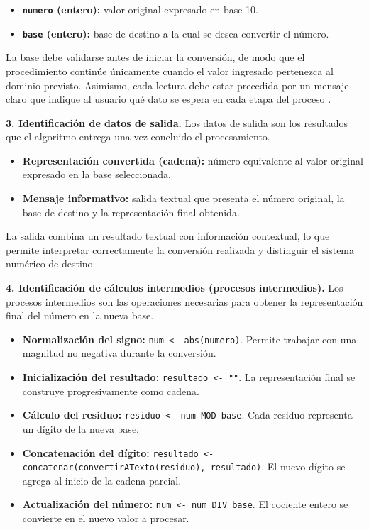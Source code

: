 \documentclass[12pt,twoside]{book}
\begin{document}
					\begin{itemize}
						\item \textbf{\texttt{numero} (entero):} valor original expresado en base 10.
						\item \textbf{\texttt{base} (entero):} base de destino a la cual se desea convertir el número.
					\end{itemize}
					
					\noindent
					La base debe validarse antes de iniciar la conversión, de modo que el procedimiento continúe únicamente cuando el valor ingresado pertenezca al dominio previsto. Asimismo, cada lectura debe estar precedida por un mensaje claro que indique al usuario qué dato se espera en cada etapa del proceso \cite{Gaddis2022Starting,Farrell2018Programming}.
					
					\noindent
					\textbf{3. Identificación de datos de salida.}
					Los datos de salida son los resultados que el algoritmo entrega una vez concluido el procesamiento.
					
					\begin{itemize}
						\item \textbf{Representación convertida (cadena):} número equivalente al valor original expresado en la base seleccionada.
						\item \textbf{Mensaje informativo:} salida textual que presenta el número original, la base de destino y la representación final obtenida.
					\end{itemize}
					
					\noindent
					La salida combina un resultado textual con información contextual, lo que permite interpretar correctamente la conversión realizada y distinguir el sistema numérico de destino.
					
					\noindent
					\textbf{4. Identificación de cálculos intermedios (procesos intermedios).}
					Los procesos intermedios son las operaciones necesarias para obtener la representación final del número en la nueva base.
					
					\begin{itemize}
						\item \textbf{Normalización del signo:} \texttt{num <- abs(numero)}. Permite trabajar con una magnitud no negativa durante la conversión.
						\item \textbf{Inicialización del resultado:} \texttt{resultado <- ""}. La representación final se construye progresivamente como cadena.
						\item \textbf{Cálculo del residuo:} \texttt{residuo <- num MOD base}. Cada residuo representa un dígito de la nueva base.
						\item \textbf{Concatenación del dígito:} \texttt{resultado <- concatenar(convertirATexto(residuo), resultado)}. El nuevo dígito se agrega al inicio de la cadena parcial.
						\item \textbf{Actualización del número:} \texttt{num <- num DIV base}. El cociente entero se convierte en el nuevo valor a procesar.
					\end{itemize}
					
\end{document}

